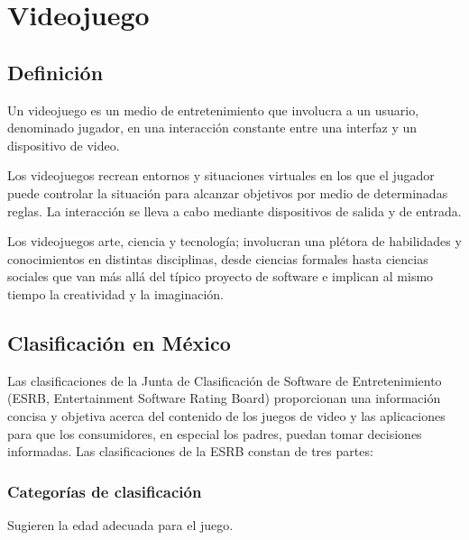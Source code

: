 \section{Videojuego}
\subsection{Definición}
Un videojuego es un medio de entretenimiento que involucra a un usuario, denominado jugador, en una interacción constante entre una interfaz y un dispositivo de video. %

Los videojuegos recrean	entornos y situaciones virtuales en los que el jugador puede controlar la situación para alcanzar objetivos por medio de determinadas reglas.
La interacción se lleva a cabo mediante	dispositivos de salida y de entrada.
		
			Los videojuegos arte, ciencia y tecnología;
			involucran una plétora de habilidades y
			conocimientos en distintas disciplinas, desde ciencias
			formales hasta ciencias sociales que van más allá del
			típico proyecto de software e implican al mismo
			tiempo la creatividad y la imaginación.
			
\subsection{Clasificación en México} %
			Las clasificaciones de la Junta de Clasificación de Software de Entretenimiento (ESRB, Entertainment Software Rating Board) proporcionan una información concisa y objetiva acerca del contenido de los juegos de video y las aplicaciones para que los consumidores, en especial los padres, puedan tomar decisiones informadas. Las clasificaciones de la ESRB constan de tres partes:
			
\subsubsection{Categorías de clasificación}

Sugieren la edad adecuada para el juego.
			
